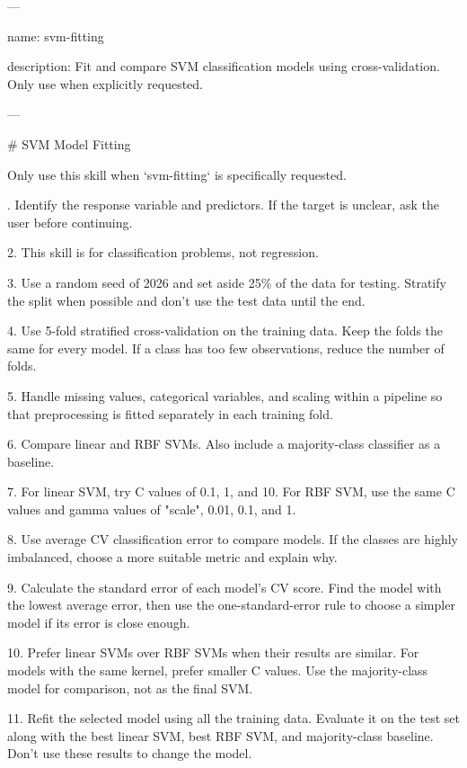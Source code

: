 \begingroup\scriptsize\ttfamily\raggedright
\par\smallskip
---\par
name: svm-fitting\par
description: Fit and compare SVM classification models using cross-validation. Only use when explicitly requested.\par
---\par
\par\smallskip
\# SVM Model Fitting\par
\par\smallskip
Only use this skill when `svm-fitting` is specifically requested.\par
\par{}. Identify the response variable and predictors. If the target is unclear, ask the user before continuing.\par
2. This skill is for classification problems, not regression.\par
3. Use a random seed of 2026 and set aside 25\% of the data for testing. Stratify the split when possible and don't use the test data until the end.\par
4. Use 5-fold stratified cross-validation on the training data. Keep the folds the same for every model. If a class has too few observations, reduce the number of folds.\par
5. Handle missing values, categorical variables, and scaling within a pipeline so that preprocessing is fitted separately in each training fold.\par
6. Compare linear and RBF SVMs. Also include a majority-class classifier as a baseline.\par
7. For linear SVM, try C values of 0.1, 1, and 10. For RBF SVM, use the same C values and gamma values of "scale", 0.01, 0.1, and 1.\par
8. Use average CV classification error to compare models. If the classes are highly imbalanced, choose a more suitable metric and explain why.\par
9. Calculate the standard error of each model's CV score. Find the model with the lowest average error, then use the one-standard-error rule to choose a simpler model if its error is close enough.\par
10. Prefer linear SVMs over RBF SVMs when their results are similar. For models with the same kernel, prefer smaller C values. Use the majority-class model for comparison, not as the final SVM.\par
11. Refit the selected model using all the training data. Evaluate it on the test set along with the best linear SVM, best RBF SVM, and majority-class baseline. Don't use these results to change the model.\par
